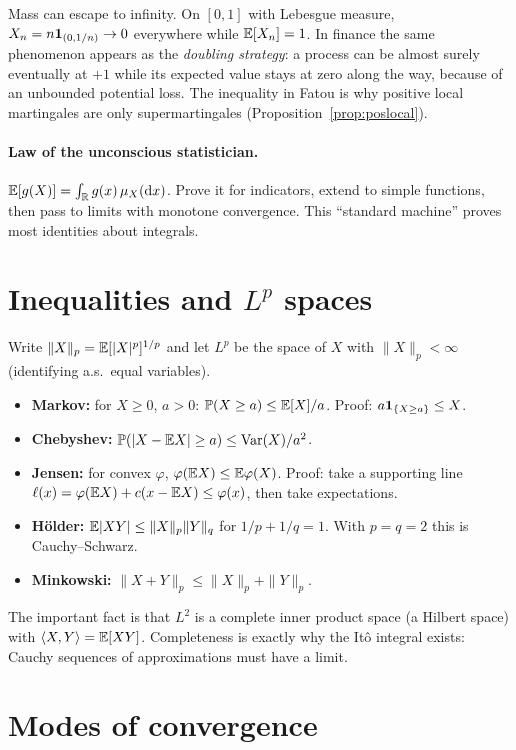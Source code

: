 \begin{pitfall}
Mass can escape to infinity. On $[0,1]$ with Lebesgue measure, $X_n=n\mathbf{1}_{(0,1/n)}\to 0$ everywhere while $\mathbb{E}[X_n]=1$. In finance the same phenomenon appears as the \emph{doubling strategy}: a process can be almost surely eventually at $+1$ while its expected value stays at zero along the way, because of an unbounded potential loss. The inequality in Fatou is why positive local martingales are only supermartingales (Proposition~\ref{prop:poslocal}).
\end{pitfall}

\paragraph{Law of the unconscious statistician.} $\mathbb{E}[g(X)]=\int_{\mathbb{R}} g(x)\,\mu_X(\mathrm{d} x)$. Prove it for indicators, extend to simple functions, then pass to limits with monotone convergence. This ``standard machine'' proves most identities about integrals.

\section{Inequalities and $L^p$ spaces}

Write $\|X\|_p=\mathbb{E}[|X|^p]^{1/p}$ and let $L^p$ be the space of $X$ with $\|X\|_p<\infty$ (identifying a.s.\ equal variables).
\begin{itemize}
\item \textbf{Markov:} for $X\ge0$, $a>0$: $\mathbb{P}(X\ge a)\le\mathbb{E}[X]/a$. Proof: $a\mathbf{1}_{\{X\ge a\}}\le X$.
\item \textbf{Chebyshev:} $\mathbb{P}(|X-\mathbb{E} X|\ge a)\le\operatorname{Var}(X)/a^2$.
\item \textbf{Jensen:} for convex $\varphi$, $\varphi(\mathbb{E} X)\le\mathbb{E}\varphi(X)$. Proof: take a supporting line $\ell(x)=\varphi(\mathbb{E} X)+c(x-\mathbb{E} X)\le\varphi(x)$, then take expectations.
\item \textbf{H\"older:} $\mathbb{E}|XY|\le\|X\|_p\|Y\|_q$ for $1/p+1/q=1$. With $p=q=2$ this is Cauchy--Schwarz.
\item \textbf{Minkowski:} $\|X+Y\|_p\le\|X\|_p+\|Y\|_p$.
\end{itemize}

The important fact is that $L^2$ is a complete inner product space (a Hilbert space) with $\langle X,Y\rangle=\mathbb{E}[XY]$. Completeness is exactly why the It\^o integral exists: Cauchy sequences of approximations must have a limit.

\section{Modes of convergence}

